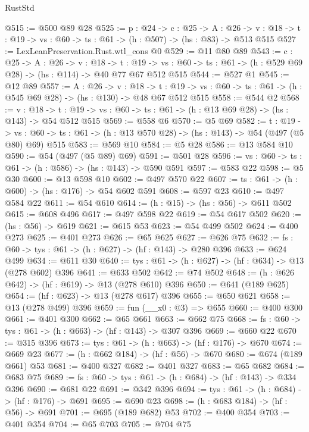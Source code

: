 \begin{lexlean}{RustStd}
\begin{coremodule}
@515 := @500 @89 @28
@525 := {p : @24} ->
  {c : @25} ->
  {A : @26} ->
  {v : @18} -> {t : @19} -> {vs : @60} -> {ts : @61} -> (h : @507) -> (hs : @83) -> @513 @515
@527 := LexLeanPreservation.Rust.wtl_cons @0
@529 := @11 @80 @89
@543 := {c : @25} ->
  {A : @26} ->
  {v : @18} ->
  {t : @19} ->
  {vs : @60} -> {ts : @61} -> (h : @529 @69 @28) -> (hs : @114) -> @40 @77 @67 @512 @515
@544 := @527 @1
@545 := @12 @89
@557 := {A : @26} ->
  {v : @18} ->
  {t : @19} -> {vs : @60} -> {ts : @61} -> (h : @545 @69 @28) -> (hs : @130) -> @48 @67 @512 @515
@558 := @544 @2
@568 := {v : @18} ->
  {t : @19} -> {vs : @60} -> {ts : @61} -> (h : @13 @69 @28) -> (hs : @143) -> @54 @512 @515
@569 := @558 @6
@570 := @5 @69
@582 := {t : @19} ->
  {vs : @60} -> {ts : @61} -> (h : @13 @570 @28) -> (hs : @143) -> @54 (@497 (@5 @80) @69) @515
@583 := @569 @10
@584 := @5 @28
@586 := @13 @584 @10
@590 := @54 (@497 (@5 @89) @69)
@591 := @501 @28
@596 := {vs : @60} -> {ts : @61} -> (h : @586) -> (hs : @143) -> @590 @591
@597 := @583 @22
@598 := @5 @30
@600 := @13 @598 @10
@602 := @497 @570 @22
@607 := {ts : @61} -> (h : @600) -> (hs : @176) -> @54 @602 @591
@608 := @597 @23
@610 := @497 @584 @22
@611 := @54 @610
@614 := (h : @15) -> (hs : @56) -> @611 @502
@615 := @608 @496
@617 := @497 @598 @22
@619 := @54 @617 @502
@620 := (hs : @56) -> @619
@621 := @615 @53
@623 := @54 @499 @502
@624 := @400 @273
@625 := @401 @273
@626 := @65 @625
@627 := @626 @75
@632 := {fs : @60} -> {tys : @61} -> (h : @627) -> (hf : @143) -> @280 @396
@633 := @624 @499
@634 := @611 @30
@640 := {tys : @61} -> (h : @627) -> (hf : @634) -> @13 (@278 @602) @396
@641 := @633 @502
@642 := @74 @502
@648 := (h : @626 @642) -> (hf : @619) -> @13 (@278 @610) @396
@650 := @641 (@189 @625)
@654 := (hf : @623) -> @13 (@278 @617) @396
@655 := @650 @621
@658 := @13 (@278 @499) @396
@659 := fun (__x0 : @3) => @655
@660 := @400 @300
@661 := @401 @300
@662 := @65 @661
@663 := @662 @75
@668 := {fs : @60} -> {tys : @61} -> (h : @663) -> (hf : @143) -> @307 @396
@669 := @660 @22
@670 := @315 @396
@673 := {tys : @61} -> (h : @663) -> (hf : @176) -> @670
@674 := @669 @23
@677 := (h : @662 @184) -> (hf : @56) -> @670
@680 := @674 (@189 @661) @53
@681 := @400 @327
@682 := @401 @327
@683 := @65 @682
@684 := @683 @75
@689 := {fs : @60} -> {tys : @61} -> (h : @684) -> (hf : @143) -> @334 @396
@690 := @681 @22
@691 := @342 @396
@694 := {tys : @61} -> (h : @684) -> (hf : @176) -> @691
@695 := @690 @23
@698 := (h : @683 @184) -> (hf : @56) -> @691
@701 := @695 (@189 @682) @53
@702 := @400 @354
@703 := @401 @354
@704 := @65 @703
@705 := @704 @75

\end{coremodule}
\end{lexlean}
